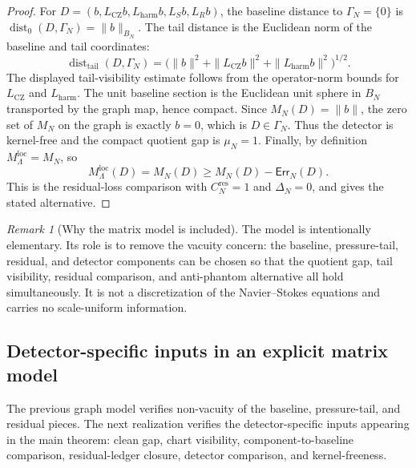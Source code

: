 \documentclass[11pt]{article}
\numberwithin{equation}{section}
\theoremstyle{definition}
\theoremstyle{remark}
\newtheorem{remark}[remark]{Remark}
\newcommand{\loc}{\mathrm{loc}}
\newcommand{\tail}{\mathrm{tail}}
\newcommand{\harm}{\mathrm{harm}}
\newcommand{\CZ}{\mathrm{CZ}}
\newcommand{\res}{\mathrm{res}}
\newcommand{\Err}{\mathsf{Err}}
\newcommand{\Dist}{\operatorname{dist}}
\begin{document}
\begin{proof}
For \(D=(b,L_{\CZ}b,L_{\harm}b,L_Sb,L_Rb)\), the baseline distance to \(\Gamma_N=\{0\}\) is \(\Dist_0(D,\Gamma_N)=\|b\|_{B_N}\).  The tail distance is the Euclidean norm of the baseline and tail coordinates:
\[
        \Dist_{\tail}(D,\Gamma_N)
        =
        \bigl(\|b\|^2+\|L_{\CZ}b\|^2+\|L_{\harm}b\|^2\bigr)^{1/2}.
\]
The displayed tail-visibility estimate follows from the operator-norm bounds for \(L_{\CZ}\) and \(L_{\harm}\).  The unit baseline section is the Euclidean unit sphere in \(B_N\) transported by the graph map, hence compact.  Since \(M_N(D)=\|b\|\), the zero set of \(M_N\) on the graph is exactly \(b=0\), which is \(D\in\Gamma_N\).  Thus the detector is kernel-free and the compact quotient gap is \(\mu_N=1\).  Finally, by definition \(M_\Lambda^{\loc}=M_N\), so
\[
        M_\Lambda^{\loc}(D)=M_N(D)
        \ge M_N(D)-\Err_N(D).
\]
This is the residual-loss comparison with \(C_N^{\res}=1\) and \(\Delta_N=0\), and  gives the stated alternative.
\end{proof}

\begin{remark}[Why the matrix model is included]
\label{rem:matrix-model-purpose}
The model is intentionally elementary.  Its role is to remove the vacuity concern: the baseline, pressure-tail, residual, and detector components can be chosen so that the quotient gap, tail visibility, residual comparison, and anti-phantom alternative all hold simultaneously.  It is not a discretization of the Navier--Stokes equations and carries no scale-uniform information.
\end{remark}


\subsection*{Detector-specific inputs in an explicit matrix model}

The previous graph model verifies non-vacuity of the baseline, pressure-tail, and residual pieces.  The next realization verifies the detector-specific inputs appearing in the main theorem: clean gap, chart visibility, component-to-baseline comparison, residual-ledger closure, detector comparison, and kernel-freeness.
\end{document}
